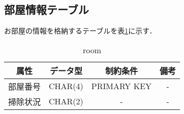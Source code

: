 \documentclass[../main]{subfiles}
\begin{document}
\subsection{部屋情報テーブル}
お部屋の情報を格納するテーブルを表\ref{fig:data_room}に示す．

 \begin{table}[H]
\begin{center}
\begin{tabular}{|c|c|c|c|}
\hline
    属性       & データ型      &  制約条件     & 備考 \\ \hline \hline
    部屋番号     & CHAR(4)       & PRIMARY KEY  &  - \\ \hline
    掃除状況     & CHAR(2)          &   -          &   - \\ \hline
    \end{tabular}
    \caption{room}
    \label{fig:data_room} 
\end{center}
\end{table}
\end{document}
